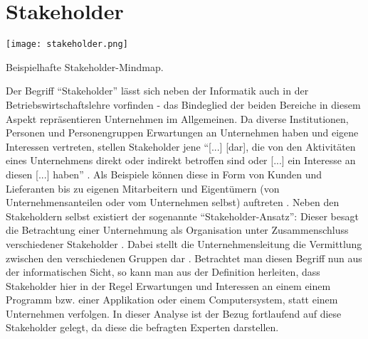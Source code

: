 \section{Stakeholder}
\begin{marginfigure}[1\baselineskip]
    \texttt{[image: stakeholder.png]}
    \caption{Beispielhafte Stakeholder-Mindmap.}
\end{marginfigure}
Der Begriff \enquote{Stakeholder} lässt sich neben der Informatik auch in der Betriebswirtschaftslehre vorfinden - das Bindeglied der beiden Bereiche in diesem Aspekt repräsentieren Unternehmen im Allgemeinen.
Da diverse Institutionen, Personen und Personengruppen Erwartungen an Unternehmen haben und eigene Interessen vertreten, stellen Stakeholder jene \enquote{[...] [dar], die von den Aktivitäten eines Unternehmens 
direkt oder indirekt betroffen sind oder [...] ein Interesse an diesen [...] haben} \cite{Fleig:2016aa}. Als Beispiele können diese in Form von Kunden und Lieferanten bis zu eigenen Mitarbeitern und Eigentümern (von 
Unternehmensanteilen oder vom Unternehmen selbst) auftreten \cite{Fleig:2016aa}. \newline Neben den Stakeholdern selbst existiert der sogenannte \enquote{Stakeholder-Ansatz}: Dieser besagt die Betrachtung einer Unternehmung
als Organisation unter Zusammenschluss verschiedener Stakeholder \cite{Seyfriedt:2018aa}. Dabei stellt die Unternehmensleitung die Vermittlung zwischen den verschiedenen Gruppen dar \cite{Seyfriedt:2018aa}. \newline
Betrachtet man diesen Begriff nun aus der informatischen Sicht, so kann man aus der Definition herleiten, dass Stakeholder hier in der Regel Erwartungen und Interessen an einem einem Programm bzw. einer Applikation oder einem 
Computersystem, statt einem Unternehmen verfolgen. \newline In dieser Analyse ist der Bezug fortlaufend auf diese Stakeholder gelegt, da diese die befragten Experten darstellen.

